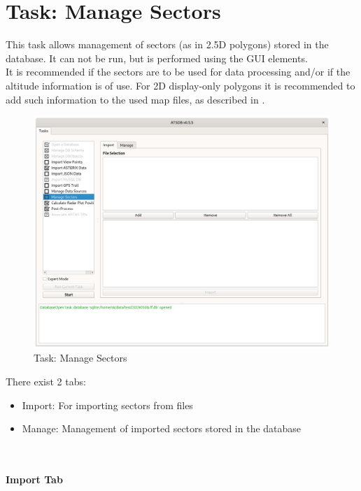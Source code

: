 \section{Task: Manage Sectors}
\label{sec:task_manage_sectors} 

This task allows management of sectors (as in 2.5D polygons) stored in the database. It can not be run, but is performed using the GUI elements. \\

It is recommended if the sectors are to be used for data processing and/or if the altitude information is of use. For 2D display-only polygons it is recommended to add such information to the used map files, as described in .

\begin{figure}[H]
  \hspace*{-2.5cm}
    \includegraphics[width=19cm]{../screenshots/manage_sectors.png}
  \caption{Task: Manage Sectors}
\end{figure}

There exist 2 tabs:

\begin{itemize}  
\item Import: For importing sectors from files
\item Manage: Management of imported sectors stored in the database
\end{itemize}
\ \\

\paragraph {Import Tab}

